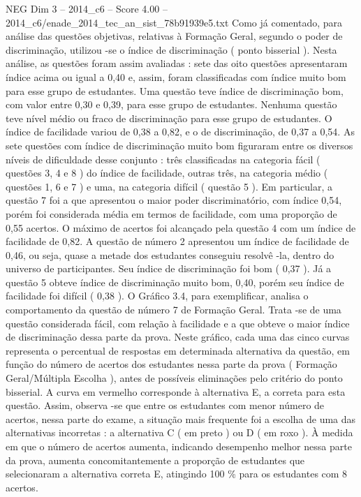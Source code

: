 \begin{textsample}{NEG Dim 3 – 2014\_c6 – Score 4.00 – 2014\_c6/enade\_2014\_tec\_an\_sist\_78b91939e5.txt}
Como já comentado, para análise das questões objetivas, relativas à Formação Geral, segundo o poder de discriminação, utilizou -se o índice de discriminação ( ponto bisserial ).
Nesta análise, as questões foram assim avaliadas : sete das oito questões apresentaram índice acima ou igual a 0,40 e, assim, foram classificadas com índice muito bom para esse grupo de estudantes.
Uma questão teve índice de discriminação bom, com valor entre 0,30 e 0,39, para esse grupo de estudantes.
Nenhuma questão teve nível médio ou fraco de discriminação para esse grupo de estudantes.
O índice de facilidade variou de 0,38 a 0,82, e o de discriminação, de 0,37 a 0,54.
As sete questões com índice de discriminação muito bom figuraram entre os diversos níveis de dificuldade desse conjunto : três classificadas na categoria fácil ( questões 3, 4 e 8 ) do índice de facilidade, outras três, na categoria médio ( questões 1, 6 e 7 ) e uma, na categoria difícil ( questão 5 ).
Em particular, a questão 7 foi a que apresentou o maior poder discriminatório, com índice 0,54, porém foi considerada média em termos de facilidade, com uma proporção de 0,55 acertos.
O máximo de acertos foi alcançado pela questão 4 com um índice de facilidade de 0,82.
A questão de número 2 apresentou um índice de facilidade de 0,46, ou seja, quase a metade dos estudantes conseguiu resolvê -la, dentro do universo de participantes.
Seu índice de discriminação foi bom ( 0,37 ).
Já a questão 5 obteve índice de discriminação muito bom, 0,40, porém seu índice de facilidade foi difícil ( 0,38 ).
O Gráfico 3.4, para exemplificar, analisa o comportamento da questão de número 7 de Formação Geral.
Trata -se de uma questão considerada fácil, com relação à facilidade e a que obteve o maior índice de discriminação dessa parte da prova.
Neste gráfico, cada uma das cinco curvas representa o percentual de respostas em determinada alternativa da questão, em função do número de acertos dos estudantes nessa parte da prova ( Formação Geral/Múltipla Escolha ), antes de possíveis eliminações pelo critério do ponto bisserial.
A curva em vermelho corresponde à alternativa E, a correta para esta questão.
Assim, observa -se que entre os estudantes com menor número de acertos, nessa parte do exame, a situação mais frequente foi a escolha de uma das alternativas incorretas : a alternativa C ( em preto ) ou D ( em roxo ).
À medida em que o número de acertos aumenta, indicando desempenho melhor nessa parte da prova, aumenta concomitantemente a proporção de estudantes que selecionaram a alternativa correta E, atingindo 100 \% para os estudantes com 8 acertos.

\end{textsample}
